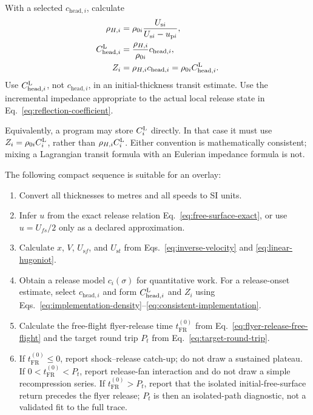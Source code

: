 \documentclass[11pt]{article}
\newcommand{\rhoz}[1][]{\rho_{0#1}}
\newcommand{\Us}[1][]{U_{\mathrm{s}#1}}
\newcommand{\up}[1][]{u_{\mathrm{p}#1}}
\newcommand{\sig}{\sigma}
\newcommand{\tFR}{t_{\mathrm{FR}}^{(0)}}
\newcommand{\Pt}{P_t}
\begin{document}
With a selected $c_{\mathrm{head},i}$, calculate
\begin{align}
  \rho_{H,i} &= \rhoz[i]\frac{\Us[i]}{\Us[i]-\up[i]},
      \label{eq:implementation-density}\\
  \CL[{\mathrm{head},i}] &=
      \frac{\rho_{H,i}}{\rhoz[i]}c_{\mathrm{head},i},
      \label{eq:implementation-release-speed}\\
  Z_i &= \rho_{H,i}c_{\mathrm{head},i}
      =\rhoz[i]\CL[{\mathrm{head},i}].
  \label{eq:consistent-implementation}
\end{align}
Use $\CL[{\mathrm{head},i}]$, not $c_{\mathrm{head},i}$, in an
initial-thickness transit estimate.  Use the incremental impedance appropriate
to the actual local release state in Eq.~\eqref{eq:reflection-coefficient}.

Equivalently, a program may store $\CL[i]$ directly.  In that case it must use
$Z_i=\rhoz[i]\CL[i]$, rather than $\rho_{H,i}\CL[i]$.  Either convention is
mathematically consistent; mixing a Lagrangian transit formula with an
Eulerian impedance formula is not.

The following compact sequence is suitable for an overlay:
\begin{enumerate}
  \item Convert all thicknesses to metres and all speeds to SI units.
  \item Infer $u$ from the exact release relation
        Eq.~\eqref{eq:free-surface-exact}, or use $u=U_{fs}/2$ only as a
        declared approximation.
  \item Calculate $x$, $V$, $\Us[f]$, and $\Us[t]$ from
        Eqs.~\eqref{eq:inverse-velocity} and \eqref{eq:linear-hugoniot}.
  \item Obtain a release model $c_i(\sig)$ for quantitative work.  For a
        release-onset estimate, select $c_{\mathrm{head},i}$ and form
        $\CL[{\mathrm{head},i}]$ and $Z_i$ using
        Eqs.~\eqref{eq:implementation-density}--\eqref{eq:consistent-implementation}.
  \item Calculate the free-flight flyer-release time $\tFR$ from
        Eq.~\eqref{eq:flyer-release-free-flight} and the target round trip
        $\Pt$ from Eq.~\eqref{eq:target-round-trip}.
  \item If $\tFR\leq0$, report shock--release catch-up; do not draw a
        sustained plateau.  If $0<\tFR<\Pt$, report release-fan interaction
        and do not draw a simple recompression series.  If $\tFR>\Pt$, report
        that the isolated initial-free-surface return precedes the flyer
        release; $\Pt$ is then an isolated-path diagnostic, not a validated
        fit to the full trace.
\end{enumerate}
\end{document}
